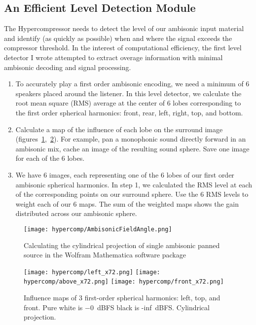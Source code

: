 \subsection{An Efficient Level Detection Module}
\label{sec:hyperc-level-detect}
The Hypercompressor needs to detect the level of our ambisonic input
material and identify (as quickly as possible) when and where the
signal exceeds the compressor threshold. In the interest of
computational efficiency, the first level detector I wrote attempted
to extract overage information with minimal ambisonic decoding and
signal processing.
\begin{enumerate}
\item To accurately play a first order ambisonic encoding, we need a
  minimum of 6 speakers placed around the listener. In this level
  detector, we calculate the root mean square (RMS) average at the
  center of 6 lobes corresponding to the first order spherical
  harmonics: front, rear, left, right, top, and bottom.
\item Calculate a map of the influence of each lobe on the surround
  image
  (figures~\ref{fig:hypercomp-mathematica},~\ref{fig:hypercomp-inf-maps}). For
  example, pan a monophonic sound directly forward in an ambisonic
  mix, cache an image of the resulting sound sphere. Save one image
  for each of the 6 lobes.
\item We have 6 images, each representing one of the 6 lobes of our
  first order ambisonic spherical harmonics. In step 1, we calculated
  the RMS level at each of the corresponding points on our surround
  sphere. Use the 6 RMS levels to weight each of our 6 maps. The sum
  of the weighted maps shows the gain distributed across our ambisonic
  sphere.
\end{enumerate}

\begin{figure}[]
  \texttt{[image: hypercomp/AmbisonicFieldAngle.png]}
  \caption{Calculating the cylindrical projection of single ambisonic panned
    source in the Wolfram Mathematica software package}
  \label{fig:hypercomp-mathematica}
\end{figure}

\begin{figure}[]
 \texttt{[image: hypercomp/left\_x72.png]}
 \texttt{[image: hypercomp/above\_x72.png]}
 \texttt{[image: hypercomp/front\_x72.png]}
  \caption{Influence maps of 3 first-order spherical harmonics: left, top, and
    front. Pure white is $-0$~dBFS black is -inf~dBFS. Cylindrical projection.}
  \label{fig:hypercomp-inf-maps}
\end{figure}

